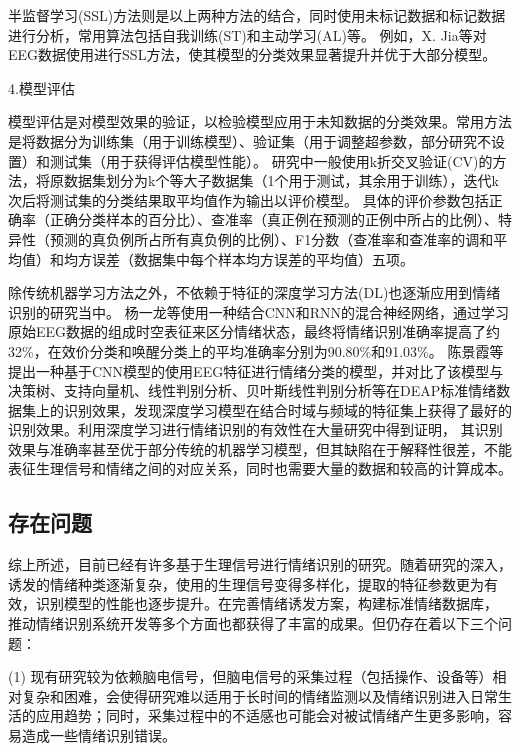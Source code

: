 \raggedbottom
半监督学习(SSL)方法则是以上两种方法的结合，同时使用未标记数据和标记数据进行分析，常用算法包括自我训练(ST)和主动学习(AL)等。
例如，X. Jia等\cite{JiaXiaowei2015}对EEG数据使用进行SSL方法，使其模型的分类效果显著提升并优于大部分模型。

4.模型评估

\raggedbottom
模型评估是对模型效果的验证，以检验模型应用于未知数据的分类效果。常用方法是将数据分为训练集（用于训练模型）、验证集（用于调整超参数，部分研究不设置）和测试集（用于获得评估模型性能）。
研究中一般使用k折交叉验证(CV)的方法，将原数据集划分为k个等大子数据集（1个用于测试，其余用于训练），迭代k次后将测试集的分类结果取平均值作为输出以评价模型。
具体的评价参数包括正确率（正确分类样本的百分比）、查准率（真正例在预测的正例中所占的比例）、特异性（预测的真负例所占所有真负例的比例）、F1分数（查准率和查准率的调和平均值）和均方误差（数据集中每个样本均方误差的平均值）五项。

除传统机器学习方法之外，不依赖于特征的深度学习方法(DL)也逐渐应用到情绪识别的研究当中。
杨一龙等\cite{YangYilong2018}使用一种结合CNN和RNN的混合神经网络，通过学习原始EEG数据的组成时空表征来区分情绪状态，最终将情绪识别准确率提高了约32\%，在效价分类和唤醒分类上的平均准确率分别为90.80\%和91.03\%。
陈景霞等\cite{ChenJX2019}提出一种基于CNN模型的使用EEG特征进行情绪分类的模型，并对比了该模型与决策树、支持向量机、线性判别分析、贝叶斯线性判别分析等在DEAP标准情绪数据集上的识别效果，发现深度学习模型在结合时域与频域的特征集上获得了最好的识别效果。利用深度学习进行情绪识别的有效性在大量研究中得到证明，
其识别效果与准确率甚至优于部分传统的机器学习模型，但其缺陷在于解释性很差，不能表征生理信号和情绪之间的对应关系，同时也需要大量的数据和较高的计算成本。


\subsection{存在问题}
综上所述，目前已经有许多基于生理信号进行情绪识别的研究。随着研究的深入，诱发的情绪种类逐渐复杂，使用的生理信号变得多样化，提取的特征参数更为有效，识别模型的性能也逐步提升。在完善情绪诱发方案，构建标准情绪数据库，
推动情绪识别系统开发等多个方面也都获得了丰富的成果。但仍存在着以下三个问题：

(1) 现有研究较为依赖脑电信号，但脑电信号的采集过程（包括操作、设备等）相对复杂和困难，会使得研究难以适用于长时间的情绪监测以及情绪识别进入日常生活的应用趋势；同时，采集过程中的不适感也可能会对被试情绪产生更多影响，容易造成一些情绪识别错误。

